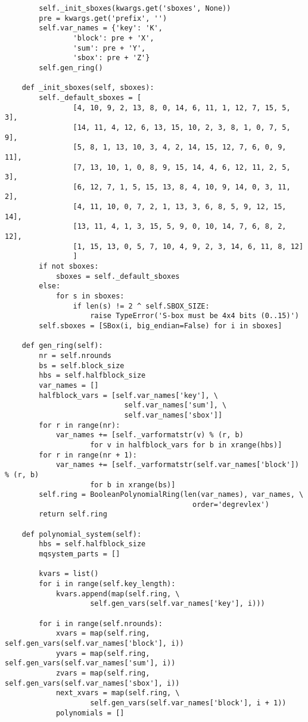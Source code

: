 \begin{lstlisting}
        self._init_sboxes(kwargs.get('sboxes', None))
        pre = kwargs.get('prefix', '')
        self.var_names = {'key': 'K', 
                'block': pre + 'X', 
                'sum': pre + 'Y',
                'sbox': pre + 'Z'}
        self.gen_ring()

    def _init_sboxes(self, sboxes):
        self._default_sboxes = [
                [4, 10, 9, 2, 13, 8, 0, 14, 6, 11, 1, 12, 7, 15, 5, 3],
                [14, 11, 4, 12, 6, 13, 15, 10, 2, 3, 8, 1, 0, 7, 5, 9],
                [5, 8, 1, 13, 10, 3, 4, 2, 14, 15, 12, 7, 6, 0, 9, 11],
                [7, 13, 10, 1, 0, 8, 9, 15, 14, 4, 6, 12, 11, 2, 5, 3],
                [6, 12, 7, 1, 5, 15, 13, 8, 4, 10, 9, 14, 0, 3, 11, 2],
                [4, 11, 10, 0, 7, 2, 1, 13, 3, 6, 8, 5, 9, 12, 15, 14],
                [13, 11, 4, 1, 3, 15, 5, 9, 0, 10, 14, 7, 6, 8, 2, 12],
                [1, 15, 13, 0, 5, 7, 10, 4, 9, 2, 3, 14, 6, 11, 8, 12]
                ]
        if not sboxes:
            sboxes = self._default_sboxes
        else:
            for s in sboxes:
                if len(s) != 2 ^ self.SBOX_SIZE: 
                    raise TypeError('S-box must be 4x4 bits (0..15)')
        self.sboxes = [SBox(i, big_endian=False) for i in sboxes]

    def gen_ring(self):
        nr = self.nrounds
        bs = self.block_size
        hbs = self.halfblock_size
        var_names = []
        halfblock_vars = [self.var_names['key'], \
                            self.var_names['sum'], \
                            self.var_names['sbox']]
        for r in range(nr):
            var_names += [self._varformatstr(v) % (r, b) 
                    for v in halfblock_vars for b in xrange(hbs)]
        for r in range(nr + 1):
            var_names += [self._varformatstr(self.var_names['block']) % (r, b) 
                    for b in xrange(bs)]
        self.ring = BooleanPolynomialRing(len(var_names), var_names, \
                                            order='degrevlex') 
        return self.ring

    def polynomial_system(self):
        hbs = self.halfblock_size
        mqsystem_parts = []

        kvars = list()
        for i in range(self.key_length):
            kvars.append(map(self.ring, \
                    self.gen_vars(self.var_names['key'], i)))

        for i in range(self.nrounds):
            xvars = map(self.ring, self.gen_vars(self.var_names['block'], i))
            yvars = map(self.ring, self.gen_vars(self.var_names['sum'], i))
            zvars = map(self.ring, self.gen_vars(self.var_names['sbox'], i))
            next_xvars = map(self.ring, \
                    self.gen_vars(self.var_names['block'], i + 1))
            polynomials = []
            

\end{lstlisting}
